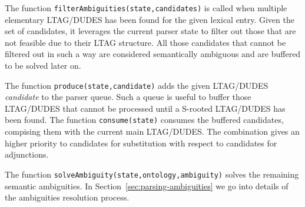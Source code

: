 The function \texttt{filterAmbiguities(state,candidates)} is called when multiple elementary LTAG/DUDES has been found for the given lexical entry.
%
Given the set of candidates, it leverages the current parser state to filter out those that are not feasible due to their LTAG structure.
%
All those candidates that cannot be filtered out in such a way are considered semantically ambiguous and are buffered to be solved later on.

The function \texttt{produce(state,candidate)} adds the given LTAG/DUDES \textit{candidate} to the parser queue. Such a queue is useful to buffer those LTAG/DUDES that cannot be processed until a S-rooted LTAG/DUDES has been found.
%
The function \texttt{consume(state)} consumes the buffered candidates, compising them with the current main LTAG/DUDES. The combination gives an higher priority to candidates for substitution with respect to candidates for adjunctions.

The function \texttt{solveAmbiguity(state,ontology,ambiguity)} solves the remaining semantic ambiguities. In Section~\ref{sec:parsing-ambiguities} we go into details of the ambiguities resolution process.